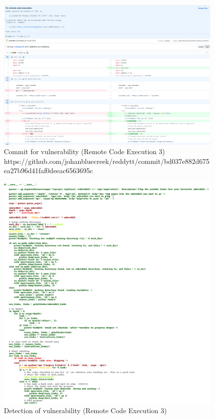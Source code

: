 \documentclass[
a4paper,
pagesize,
pdftex,
12pt,
twoside, %
BCOR=5mm, %
ngerman,
fleqn,
final,
]{scrartcl}
\begin{document}
	\begin{figure}[H]
		\centering
		\includegraphics[width=\linewidth]{Images/remote_code_executionC}
		\caption{Commit for vulnerability (Remote Code Execution 3) \newline \scriptsize{https://github.com/johanbluecreek/reddytt/commit/bd037e882d675ea27b96d41faf0deeac6563695c}}
		\label{fig:remote_code_executionC}
	\end{figure}
	\begin{figure}[H]
		\centering
		\includegraphics[width=\linewidth]{Images/remote_code_executionCr}
		\caption{Detection of vulnerability (Remote Code Execution 3)}
		\label{fig:remote_code_executionCr}
	\end{figure}
	
\end{document}

